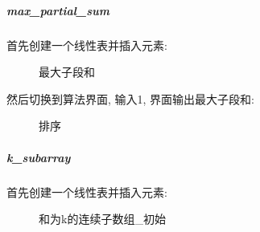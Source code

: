 \documentclass[supercite]{Experimental_Report}
\theoremstyle{definition}
\begin{document}
\clearpage
\subparagraph{max\_partial\_sum}
\noindent
首先创建一个线性表并插入元素:
\begin{figure}[htbp]
	\centering
	\centering
	\caption{最大子段和}
	\label{fig4-4}
\end{figure}

\noindent
然后切换到算法界面, 输入1, 界面输出最大子段和:
\begin{figure}[htbp]
	\centering
	\centering
	\caption{排序}
	\label{fig4-5}
\end{figure}

\subparagraph{k\_subarray}
\noindent
首先创建一个线性表并插入元素:
\begin{figure}[htbp]
	\centering
	\centering
	\caption{和为k的连续子数组\_初始}
	\label{fig4-6}
\end{figure}
\end{document}

